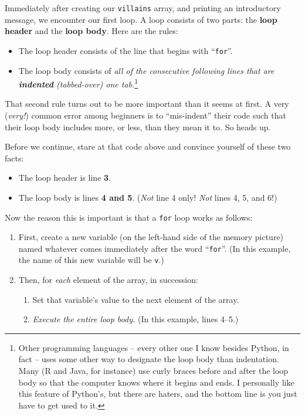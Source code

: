 Immediately after creating our \texttt{villains} array, and printing an
introductory message, we encounter our first loop. A loop consists of two
parts: the \textbf{loop header} and the \textbf{loop body}. Here are the rules:


\begin{itemize}[nosep]
\item The loop header consists of the line that begins with ``\texttt{for}''.
\item The loop body consists of \textit{all of the consecutive following lines
that are \textbf{indented} (tabbed-over) one tab.}\footnote{Other programming
languages -- every other one I know besides Python, in fact -- uses some other
way to designate the loop body than indentation. Many (R and Java, for
instance) use curly braces before and after the loop body so that the computer
knows where it begins and ends. I personally like this feature of Python's, but
there are haters, and the bottom line is you just have to get used to it.}
\end{itemize}

That second rule turns out to be more important than it seems at first. A very
(\textit{very!}) common error among beginners is to ``mis-indent'' their code
such that their loop body includes more, or less, than they mean it to. So
heads up.

Before we continue, stare at that code above and convince yourself of these two
facts:

\begin{itemize}[nosep]
\item The loop header is line \textbf{3}.
\item The loop body is lines \textbf{4 and 5}. (\textit{Not} line 4
only! \textit{Not} lines 4, 5, and 6!)
\end{itemize}

\medskip
Now the reason this is important is that a \texttt{for} loop works as follows:
\vspace{-.1in}


\begin{shaded}
\begin{enumerate}[nosep]
\itemsep.1em
\item First, create a new variable (on the left-hand side of the memory
picture) named whatever comes immediately after the word ``\texttt{for}''. (In
this example, the name of this new variable will be \texttt{v}.)
\item Then, for \textit{each} element of the array, in succession:
    \begin{enumerate}[nosep]
    \itemsep.1em
    \item Set that variable's value to the next element of the array.
    \item \textit{Execute the entire loop body.} (In this example, lines 4--5.)
    \end{enumerate}
\end{enumerate}
\end{shaded}

